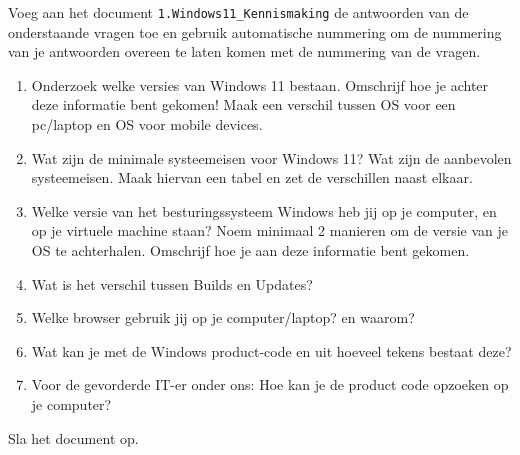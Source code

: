Voeg aan het document \texttt{1.Windows11\_Kennismaking} de antwoorden van de onderstaande vragen toe en gebruik automatische nummering om de nummering van je antwoorden overeen te laten komen met de nummering van de vragen.

\begin{enumerate}
\item Onderzoek welke versies van Windows 11 bestaan.
           Omschrijf hoe je achter deze informatie bent gekomen! Maak een verschil tussen OS voor een pc/laptop en OS voor mobile devices.

\item Wat zijn de minimale systeemeisen voor Windows 11? Wat zijn de aanbevolen systeemeisen. 
             Maak hiervan een tabel en zet de verschillen naast elkaar.

\item Welke versie van het besturingssysteem Windows heb jij op je computer, en op je virtuele machine staan? Noem minimaal 2 manieren om de versie van je OS te achterhalen. Omschrijf hoe je aan deze informatie bent gekomen.         

\item Wat is het verschil tussen Builds en Updates?

\item Welke browser gebruik jij op je computer/laptop? en waarom?

\item Wat kan je met de Windows product-code en uit hoeveel tekens bestaat deze?

\item Voor de gevorderde IT-er onder ons:
             Hoe kan je de product code opzoeken op je computer?
\end{enumerate}

Sla het document op.

